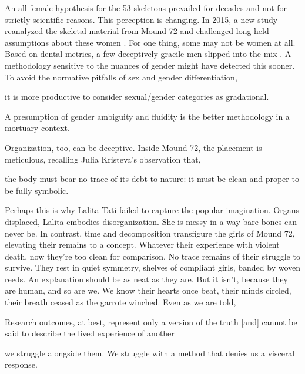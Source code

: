 An all-female hypothesis for the 53 skeletons prevailed for decades and not for strictly scientific reasons. This perception is changing. In 2015, a new study reanalyzed the skeletal material from Mound 72 and challenged long-held assumptions about these women \parencite[]{slater2014}. For one thing, some may not be women at all. Based on dental metrics, a few deceptively gracile men slipped into the mix \parencite[]{thompson2013}. A methodology sensitive to the nuances of gender might have detected this sooner. To avoid the normative pitfalls of sex and gender differentiation, \begin{IJSRAquote}{\cite[3]{rautman2000}}it is more productive to consider sexual/gender categories as gradational.\end{IJSRAquote} A presumption of gender ambiguity and fluidity is the better methodology in a mortuary context. 

Organization, too, can be deceptive. Inside Mound 72, the placement is meticulous, recalling Julia Kristeva's observation that, \begin{IJSRAquote}{\cite[102]{kristeva1982}}the body must bear no trace of its debt to nature: it must be clean and proper to be fully symbolic.\end{IJSRAquote} Perhaps this is why Lalita Tati failed to capture the popular imagination. Organs displaced, Lalita embodies disorganization. She is messy in a way bare bones can never be. In contrast, time and decomposition transfigure the girls of Mound 72, elevating their remains to a concept. Whatever their experience with violent death, now they're too clean for comparison. No trace remains of their struggle to survive. They rest in quiet symmetry, shelves of compliant girls, banded by woven reeds. An explanation should be as neat as they are. But it isn't, because they are human, and so are we. We know their hearts once beat, their minds circled, their breath ceased as the garrote winched. Even as we are told, \begin{IJSRAquote}{\cite[1153]{hewitt2007}}Research outcomes, at best, represent only a version of the truth [and] cannot be said to describe the lived experience of another\end{IJSRAquote} we struggle alongside them. We struggle with a method that denies us a visceral response. 

\nocite{ubelaker1992,thompson2015,pauketat1997,fowler1977,emerson2016}
\printbibliography[
title={For further reading},
keyword={furtherreading},
heading=subbibliography]
\printbibliography[
title={References},
notkeyword =furtherreading,
heading=subbibliography]

\IJSRAclosing%